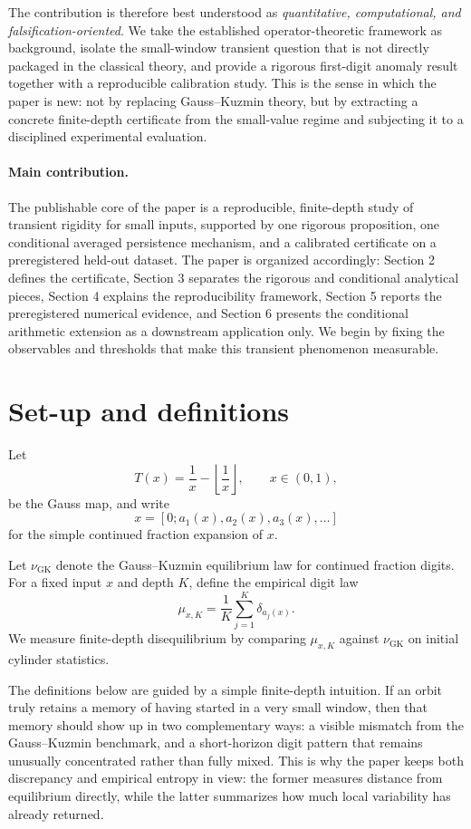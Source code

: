 \documentclass[11pt]{article}
\begin{document}
The contribution is therefore best understood as \emph{quantitative, computational, and falsification-oriented}. We take the established operator-theoretic framework as background, isolate the small-window transient question that is not directly packaged in the classical theory, and provide a rigorous first-digit anomaly result together with a reproducible calibration study. This is the sense in which the paper is new: not by replacing Gauss--Kuzmin theory, but by extracting a concrete finite-depth certificate from the small-value regime and subjecting it to a disciplined experimental evaluation.

\paragraph{Main contribution.} The publishable core of the paper is a reproducible, finite-depth study of transient rigidity for small inputs, supported by one rigorous proposition, one conditional averaged persistence mechanism, and a calibrated certificate on a preregistered held-out dataset. The paper is organized accordingly: Section 2 defines the certificate, Section 3 separates the rigorous and conditional analytical pieces, Section 4 explains the reproducibility framework, Section 5 reports the preregistered numerical evidence, and Section 6 presents the conditional arithmetic extension as a downstream application only. We begin by fixing the observables and thresholds that make this transient phenomenon measurable.

\section{Set-up and definitions}

Let
\[
T(x)=\frac{1}{x}-\left\lfloor\frac{1}{x}\right\rfloor, \qquad x\in(0,1),
\]
be the Gauss map, and write
\[
x=[0;a_1(x),a_2(x),a_3(x),\dots]
\]
for the simple continued fraction expansion of $x$.

Let $\nu_{\mathrm{GK}}$ denote the Gauss--Kuzmin equilibrium law for continued fraction digits. For a fixed input $x$ and depth $K$, define the empirical digit law
\[
\mu_{x,K}=\frac{1}{K}\sum_{j=1}^{K}\delta_{a_j(x)}.
\]
We measure finite-depth disequilibrium by comparing $\mu_{x,K}$ against $\nu_{\mathrm{GK}}$ on initial cylinder statistics.

The definitions below are guided by a simple finite-depth intuition. If an orbit truly retains a memory of having started in a very small window, then that memory should show up in two complementary ways: a visible mismatch from the Gauss--Kuzmin benchmark, and a short-horizon digit pattern that remains unusually concentrated rather than fully mixed. This is why the paper keeps both discrepancy and empirical entropy in view: the former measures distance from equilibrium directly, while the latter summarizes how much local variability has already returned.
\end{document}
